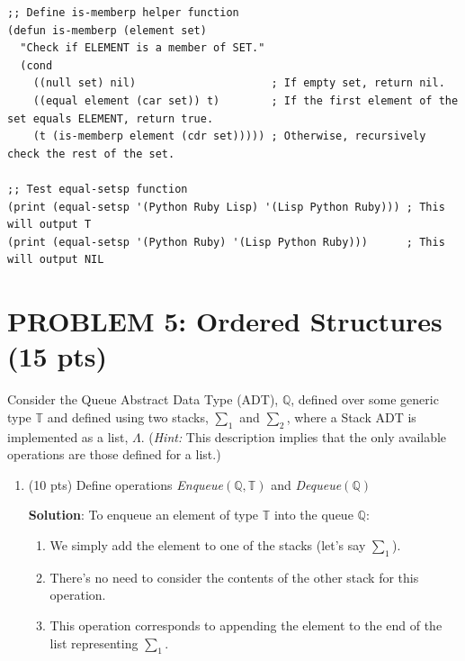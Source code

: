 \documentclass[12pt]{article}
\begin{document}
\begin{spacing}{1.5}
\begin{enumerate}
\begin{itemize}
\begin{lstlisting}
;; Define is-memberp helper function
(defun is-memberp (element set)
  "Check if ELEMENT is a member of SET."
  (cond
    ((null set) nil)                     ; If empty set, return nil.
    ((equal element (car set)) t)        ; If the first element of the set equals ELEMENT, return true.
    (t (is-memberp element (cdr set))))) ; Otherwise, recursively check the rest of the set.

;; Test equal-setsp function
(print (equal-setsp '(Python Ruby Lisp) '(Lisp Python Ruby))) ; This will output T
(print (equal-setsp '(Python Ruby) '(Lisp Python Ruby)))      ; This will output NIL
		      	      \end{lstlisting}
		      	      		      	      		      	      		      	                      
		      \end{itemize}
		      		      		      		                  
	\end{enumerate}
				        
	\newpage
	\section*{PROBLEM 5: Ordered Structures (15 pts)}
	Consider the Queue Abstract Data Type (ADT), $\mathbb{Q}$, defined over some generic type $\mathbb{T}$ and defined using two stacks, $\sum_1$ and $\sum_2$, where a Stack ADT is implemented as a list, $\Lambda$. (\textit{Hint: } This description implies that the only available operations are those defined for a list.) 
				
	\begin{enumerate}
		\item (10 pts) Define operations \textit{Enqueue}$(\mathbb{Q},\mathbb{T})$ and \textit{Dequeue}$(\mathbb{Q})$
		      		      		      		      
		      \textbf{Solution}: To enqueue an element of type $\mathbb{T}$ into the queue $\mathbb{Q}$:
		      		      		      		      
		      \begin{enumerate}
		      	\item We simply add the element to one of the stacks (let's say $\sum_1$).
		      	\item There's no need to consider the contents of the other stack for this operation.
		      	\item This operation corresponds to appending the element to the end of the list representing $\sum_1$.
		      \end{enumerate} 
		      		      		      		      

\end{enumerate}
\end{spacing}
\end{document}
